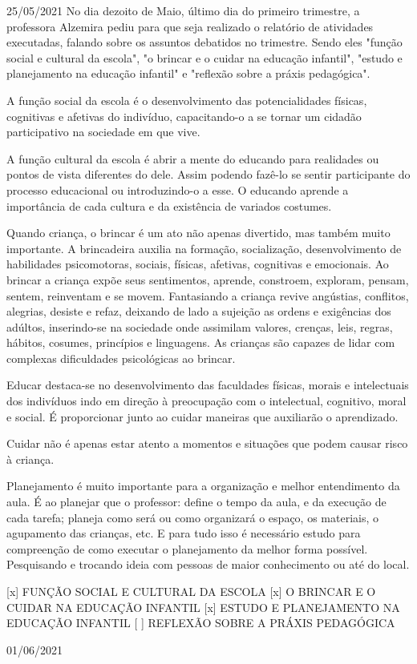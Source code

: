 \documentclass{SchoolBook}
\begin{document}
\begin{day}{25/05/2021}
        No dia dezoito de Maio, último dia do primeiro trimestre, a professora Alzemira pediu para que seja realizado o relatório de atividades executadas, falando sobre os assuntos debatidos no trimestre. Sendo eles "função social e cultural da escola", "o brincar e o cuidar na educação infantil", "estudo e planejamento na educação infantil" e "reflexão sobre a práxis pedagógica".
        
        A função social da escola é o desenvolvimento das potencialidades físicas, cognitivas e afetivas do indivíduo, capacitando-o a se tornar um cidadão participativo na sociedade em que vive.
        
        A função cultural da escola é abrir a mente do educando para realidades ou pontos de vista diferentes do dele. Assim podendo fazê-lo se sentir participante do processo educacional ou introduzindo-o a esse. O educando aprende a importância de cada cultura e da existência de variados costumes.
        
        Quando criança, o brincar é um ato não apenas divertido, mas também muito importante. A brincadeira auxilia na formação, socialização, desenvolvimento de habilidades psicomotoras, sociais, físicas, afetivas, cognitivas e emocionais. Ao brincar a criança expõe seus sentimentos, aprende, constroem, exploram, pensam, sentem, reinventam e se movem. Fantasiando a criança revive angústias, conflitos, alegrias, desiste e refaz, deixando de lado a sujeição as ordens e exigências dos adúltos, inserindo-se na sociedade onde assimilam valores, crenças, leis, regras, hábitos, cosumes, princípios e linguagens. As crianças são capazes de lidar com complexas dificuldades psicológicas ao brincar.
        
        Educar destaca-se no desenvolvimento das faculdades físicas, morais e intelectuais dos indivíduos indo em direção à preocupação com o intelectual, cognitivo, moral e social. É proporcionar junto ao cuidar maneiras que auxiliarão o aprendizado.
        
        Cuidar não é apenas estar atento a momentos e situações que podem causar risco à criança.
        
        Planejamento é muito importante para a organização e melhor entendimento da aula. É ao planejar que o professor: define o tempo da aula, e da execução de cada tarefa; planeja como será ou como organizará o espaço, os materiais, o agupamento das crianças, etc. E para tudo isso é necessário estudo para compreenção de como executar o planejamento da melhor forma possível. Pesquisando e trocando ideia com pessoas de maior conhecimento ou até do local.
        
        
        
        
        [x] FUNÇÃO SOCIAL E CULTURAL DA ESCOLA
        [x] O BRINCAR E O CUIDAR NA EDUCAÇÃO INFANTIL
        [x] ESTUDO E PLANEJAMENTO NA EDUCAÇÃO INFANTIL
        [ ] REFLEXÃO SOBRE A PRÁXIS PEDAGÓGICA
    \end{day}
    
    \begin{day}{01/06/2021}
        
    \end{day}
\end{document}
